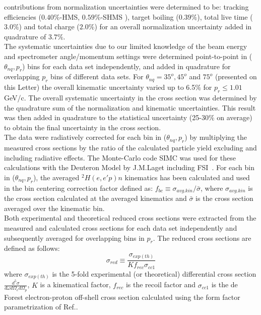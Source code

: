 contributions from normalization uncertainties were determined to be: tracking efficiencies ($0.40 \%$-HMS, $0.59 \%$-SHMS ), target boiling ($0.39 \%$), total live time ($3.0 \%$) and total charge ($2.0\%$)
for an overall normalization uncertainty added in quadrature of $3.7 \%$. \\
\indent The systematic uncertainties due to our limited knowledge of the beam energy and spectrometer angle/momentum settings were determined point-to-point in ($\theta_{nq}, p_{r}$) bins for each data set independently, and added in quadrature for overlapping $p_{r}$ bins
of different data sets. For $\theta_{nq}= 35^{o}, 45^{o}$ and $75^{o}$ (presented on this Letter) the overall kinematic uncertainty varied up to 6.5$\%$ for $p_{r}\leq1.01$ GeV/c.
The overall systematic uncertainty in the cross section was determined by the quadrature sum of the normalization and kinematic uncertainties. This result was then added in quadrature
to the statistical uncertainty (25-30$\%$ on average) to obtain the final uncertainty in the cross section. \\
\indent The data were radiatively corrected for each bin in ($\theta_{nq}, p_{r}$) by multiplying the measured cross sections by the ratio of the calculated particle yield excluding and including radiative effects. The Monte-Carlo code SIMC was used for these calculations with the Deuteron Model by J.M.Laget including FSI~\cite{LAGET2005}.
For each bin in ($\theta_{nq}, p_{r}$), the averaged $^{2}H(e,e'p)n$ kinematics has been calculated and used in the bin centering correction factor defined as:
$f_{bc} \equiv \sigma_{avg.kin} / \bar{\sigma}$, where $\sigma_{avg.kin}$ is the cross section calculated at the averaged kinematics and $\bar{\sigma}$ is the cross section averaged
over the kinematic bin.\\
\indent Both experimental and theoretical reduced cross sections were extracted from the measured and calculated cross sections for each data set independently and subsequently averaged
for overlapping bins in $p_{r}$. The reduced cross sections are defined as follows:
\begin{equation}
\sigma_{red} \equiv \frac{\sigma_{exp(th)}}{Kf_{rec}\sigma_{cc1}}
\label{eq:1}
\end{equation}
where $\sigma_{exp(th)}$ is the 5-fold experimental (or theoretical) differential cross section $\frac{d^{5}\sigma}{d\omega d\Omega_{e} d\Omega_{p}}$, $K$ is a kinematical factor, $f_{rec}$ is the recoil factor  and $\sigma_{cc1}$ is the de Forest\cite{DEFOREST1983} electron-proton off-shell cross section calculated using the form factor parametrization of Ref.\cite{PhysRevC.69.022201}.
